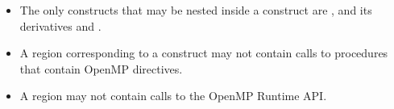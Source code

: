 \begin{itemize}

\item The only constructs that may be nested inside a  construct
    are ,  and its derivatives and .

\item A  region corresponding to a  construct may not contain calls to procedures that contain
OpenMP directives. 

\item A  region  may not contain calls to the OpenMP Runtime
    API.


\end{itemize}
